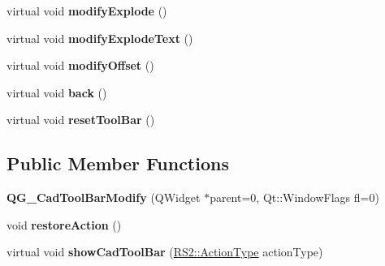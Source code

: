 \begin{DoxyCompactItemize}
\item 
\hypertarget{classQG__CadToolBarModify_a8e94f48d38692f143676f76a58c803bb}{virtual void {\bfseries modify\-Explode} ()}\label{classQG__CadToolBarModify_a8e94f48d38692f143676f76a58c803bb}

\item 
\hypertarget{classQG__CadToolBarModify_ab02a8452211e00f6059501e4699b167b}{virtual void {\bfseries modify\-Explode\-Text} ()}\label{classQG__CadToolBarModify_ab02a8452211e00f6059501e4699b167b}

\item 
\hypertarget{classQG__CadToolBarModify_aa4bc92803e5292ff40d527a3f67bdfc7}{virtual void {\bfseries modify\-Offset} ()}\label{classQG__CadToolBarModify_aa4bc92803e5292ff40d527a3f67bdfc7}

\item 
\hypertarget{classQG__CadToolBarModify_a1e251247fb2bff75314da30aaea151c9}{virtual void {\bfseries back} ()}\label{classQG__CadToolBarModify_a1e251247fb2bff75314da30aaea151c9}

\item 
\hypertarget{classQG__CadToolBarModify_ad6e9c0f6e5b1eab423a6ca90d94ea3a0}{virtual void {\bfseries reset\-Tool\-Bar} ()}\label{classQG__CadToolBarModify_ad6e9c0f6e5b1eab423a6ca90d94ea3a0}

\end{DoxyCompactItemize}
\subsection*{Public Member Functions}
\begin{DoxyCompactItemize}
\item 
\hypertarget{classQG__CadToolBarModify_af78b33bafc74f7bfa3d370f07c9e8812}{{\bfseries Q\-G\-\_\-\-Cad\-Tool\-Bar\-Modify} (Q\-Widget $\ast$parent=0, Qt\-::\-Window\-Flags fl=0)}\label{classQG__CadToolBarModify_af78b33bafc74f7bfa3d370f07c9e8812}

\item 
\hypertarget{classQG__CadToolBarModify_a1c41abd8f711513f2ceaa2421cd4e8ad}{void {\bfseries restore\-Action} ()}\label{classQG__CadToolBarModify_a1c41abd8f711513f2ceaa2421cd4e8ad}

\item 
\hypertarget{classQG__CadToolBarModify_a0a86e898f71bd3ef0534d52bd12d54f4}{virtual void {\bfseries show\-Cad\-Tool\-Bar} (\hyperlink{classRS2_afe3523e0bc41fd637b892321cfc4b9d7}{R\-S2\-::\-Action\-Type} action\-Type)}\label{classQG__CadToolBarModify_a0a86e898f71bd3ef0534d52bd12d54f4}

\end{DoxyCompactItemize}
